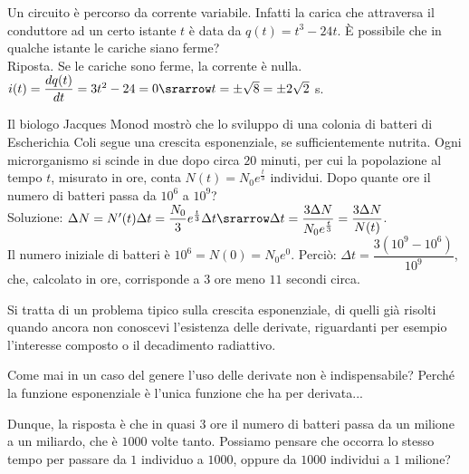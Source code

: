 \begin{esempio}
 Un circuito è percorso da corrente variabile. Infatti la carica che attraversa
il conduttore ad un certo istante $t$ è data da $q(t)=t^3-24t$. È possibile che in
qualche istante le cariche siano ferme?\\
Riposta. Se le cariche sono ferme, la corrente è nulla.\\ 
$i(t)=\dfrac{dq(t)}{dt}=3t^2-24=0\srarrow t=\pm\sqrt{8}=\pm2\sqrt{2}$ s.\\
\end{esempio}

\begin{esempio}
Il biologo Jacques Monod mostrò che lo sviluppo di una colonia di batteri di 
 Escherichia Coli segue una crescita esponenziale, se sufficientemente nutrita. 
 Ogni microrganismo si scinde in due dopo circa $20$ minuti, per cui la
 popolazione al tempo $t$, misurato in ore, conta $N(t)=N_0e^{\frac{t}{3}}$
 individui. Dopo quante ore il numero di batteri passa da $10^6$ a $10^9$?\\
 Soluzione: $\Delta N=N'(t)\Delta t=\dfrac{N_0}{3}e^{\frac{t}{3}}\Delta t
 \srarrow \Delta t=\dfrac{3\Delta N}{N_0e^{\frac{t}{3}}}=\dfrac{3\Delta N}
 {N(t)}$.\\
 Il numero iniziale di batteri è $10^6=N(0)=N_0e^0$. Perciò:
 $\Delta t=\dfrac{3(10^9-10^6)}{10^9}$, che, calcolato in ore, 
 corrisponde a 3 ore meno $11$ secondi circa.
 \begin{osservazione}
 Si tratta di un problema tipico sulla crescita esponenziale, di quelli già 
 risolti quando ancora non conoscevi l'esistenza delle derivate, riguardanti
 per esempio l'interesse composto o il decadimento radiattivo.
\end{osservazione}

\begin{osservazione}
 Come mai in un caso del genere l'uso delle derivate non è indispensabile? Perché
 la funzione esponenziale è l'unica funzione che ha per derivata...
\end{osservazione}

\begin{osservazione}
Dunque, la risposta è che in quasi $3$ ore il numero di batteri passa da un 
milione a un miliardo, che è $1000$ volte tanto. Possiamo pensare che occorra
lo stesso tempo per passare da $1$ individuo a $1000$, oppure da $1000$ 
individui a $1$ milione?
\end{osservazione}
\end{esempio}
 

